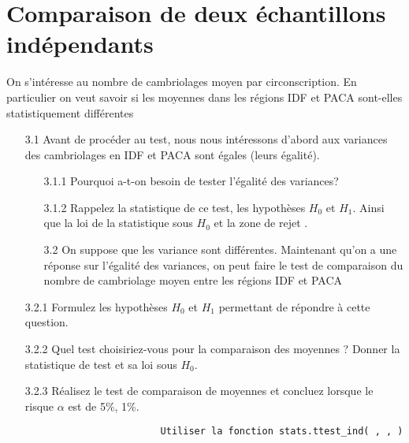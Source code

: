 \documentclass[11pt,a4paper]{article}
\begin{document}
		\section{Comparaison de deux \'echantillons ind\'ependants}				
					On s'int\'eresse au nombre de cambriolages moyen par circonscription. En particulier on veut savoir si les moyennes  dans les r\'egions IDF et  PACA sont-elles statistiquement diff\'erentes
					\begin{itemize}
						\item[3.1] Avant de proc\'eder au test, nous nous intéressons d'abord aux variances des cambriolages en IDF et PACA sont \'egales (leurs égalité).
						\begin{itemize}	
						\item[3.1.1] Pourquoi a-t-on besoin de tester l'\'egalit\'e des variances?
						\item [3.1.2]Rappelez la statistique de ce test, les hypoth\`eses $H_0$ et $H_1$. Ainsi que la loi de la statistique sous $H_0$ et la zone de rejet .
						\end{itemize}
					\begin{itemize}
					\item[3.2] On suppose que les variance sont différentes. Maintenant qu'on a une réponse sur l'égalité des variances, on peut faire le test de comparaison du nombre de cambriolage moyen entre les régions IDF et PACA
					\end{itemize}
					\item [3.2.1] Formulez les hypoth\`eses $H_0$ et $H_1$ permettant de r\'epondre \`a cette question.
		 		 \item [3.2.2] Quel test choisiriez-vous pour la comparaison des moyennes ? Donner la statistique de test et sa loi sous $H_0$.
						\item [3.2.3]R\'ealisez le test de comparaison de moyennes et concluez lorsque le risque $\alpha$ est de 5\%, 1\%.
							\begin{lstlisting}
						Utiliser la fonction stats.ttest_ind( , , )
							\end{lstlisting}
					\end{itemize}
\end{document}
